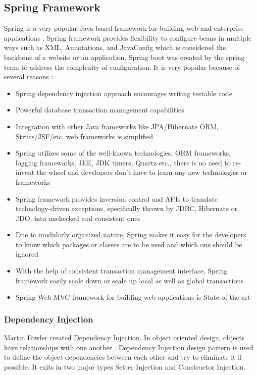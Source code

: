 \subsection{Spring Framework}
Spring is a very popular Java-based framework for building web and enterprise applications \cite{SpringBoot}. Spring framework provides flexibility to configure beans in multiple ways such as XML, Annotations, and JavaConfig which is considered the backbone of a website or an application. Spring boot was created by the spring team to address the complexity of configuration. It is very popular because of several reasons \cite{SpringBoot}:
\begin{itemize}
	\item Spring dependency injection approach encourages writing testable code
	\item Powerful database transaction management capabilities
	\item Integration with other Java frameworks like JPA/Hibernate ORM, Struts/JSF/etc. web frameworks is simplified
	\item Spring utilizes some of the well-known technologies, ORM frameworks, logging frameworks, JEE, JDK timers, Quartz etc., there is no need to re-invent the wheel and developers don’t have to learn any new technologies or frameworks \cite{SpringAdv}
	\item Spring framework provides inversion control and APIs to translate technology-driven exceptions, specifically thrown by JDBC, Hibernate or JDO, into unchecked and consistent ones \cite{SpringAdv}
	\item Due to modularly organized nature, Spring makes it easy for the developers to know which packages or classes are to be used and which one should be ignored \cite{SpringAdv}
	\item With the help of consistent transaction management interface, Spring framework easily scale down or scale up local as well as global transactions\cite{SpringAdv}
	\item Spring Web MVC framework for building web applications is State of the art 
\end{itemize}
\subsubsection{Dependency Injection}
Martin Fowler created Dependency Injection. In object oriented design, objects have relationships with one another \cite{DI}. Dependency Injection design pattern is used to define the object dependencies between each other and try to eliminate it if possible. It exits in two major types Setter Injection and Constructor Injection.

